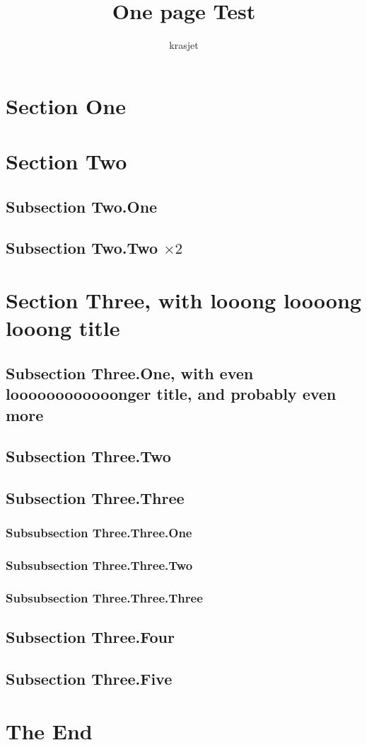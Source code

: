 \documentclass{article}
\title{One page Test}
\author{krasjet}
\date{}
\begin{document}
\maketitle

\section{Section One}

\section{Section Two}

\subsection{Subsection Two.One}
\subsection{Subsection Two.Two $\times 2$}

\section{Section Three, with looong loooong looong title}

\subsection{Subsection Three.One, with even loooooooooooonger title, and
probably even more}

\subsection{Subsection Three.Two}

\subsection{Subsection Three.Three}
\subsubsection{Subsubsection Three.Three.One}
\subsubsection{Subsubsection Three.Three.Two}
\subsubsection{Subsubsection Three.Three.Three}

\subsection{Subsection Three.Four}

\subsection{Subsection Three.Five}

\section{The End}
\end{document}
